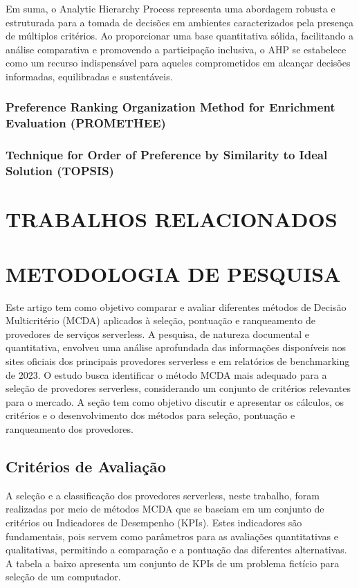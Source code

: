\documentclass[12pt]{article}[abntex2]
\begin{document}
Em suma, o Analytic Hierarchy Process representa uma abordagem robusta e estruturada para a tomada de decisões em ambientes caracterizados pela presença de múltiplos critérios. Ao proporcionar uma base quantitativa sólida, facilitando a análise comparativa e promovendo a participação inclusiva, o AHP se estabelece como um recurso indispensável para aqueles comprometidos em alcançar decisões informadas, equilibradas e sustentáveis.

\subsubsection{Preference Ranking Organization Method for Enrichment Evaluation (PROMETHEE)}
\subsubsection{Technique for Order of Preference by Similarity to Ideal Solution (TOPSIS)}

\section{TRABALHOS RELACIONADOS}
\section{METODOLOGIA DE PESQUISA}
Este artigo tem como objetivo comparar e avaliar diferentes métodos de Decisão Multicritério (MCDA) aplicados à seleção, pontuação e ranqueamento de provedores de serviços serverless. A pesquisa, de natureza documental e quantitativa, envolveu uma análise aprofundada das informações disponíveis nos sites oficiais dos principais provedores serverless e em relatórios de benchmarking de 2023. O estudo busca identificar o método MCDA mais adequado para a seleção de provedores serverless, considerando um conjunto de critérios relevantes para o mercado. A seção tem como objetivo discutir e apresentar os cálculos, os critérios e o desenvolvimento dos métodos para seleção, pontuação e ranqueamento dos provedores.

\subsection{Critérios de Avaliação}
A seleção e a classificação dos provedores serverless, neste trabalho, foram realizadas por meio de métodos MCDA que se baseiam em um conjunto de critérios ou Indicadores de Desempenho (KPIs). Estes indicadores são fundamentais, pois servem como parâmetros para as avaliações quantitativas e qualitativas, permitindo a comparação e a pontuação das diferentes alternativas. A tabela a baixo apresenta um conjunto de KPIs de um problema fictício para seleção de um computador.
\end{document}
